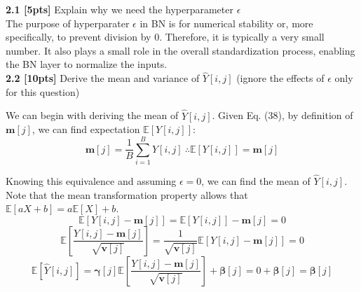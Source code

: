 \documentclass{article}
\begin{document}
\noindent
\textbf{2.1 [5pts]} Explain why we need the hyperparameter $\epsilon$\\

{\color{blue}
The purpose of hyperparater $\epsilon$ in BN is for numerical stability or, more specifically, to prevent division by 0. Therefore, it is typically a very small number. It also plays a small role in the overall standardization process, enabling the BN layer to normalize the inputs. 
}\\

\noindent
\textbf{2.2 [10pts]} Derive the mean and variance of $\hat{Y}[i,j]$ (ignore the effects of $\epsilon$ only for this question)\\

{\color{blue}
We can begin with deriving the mean of $\hat{Y}[i,j]$. Given Eq. (38), by definition of $\textbf{m}[j]$, we can find expectation $\mathbb{E}[Y[i,j]]$:
\begin{equation}
    \textbf{m}[j]= \frac{1}{B} \sum_{i=1}^{B}Y[i,j] \ \therefore \mathbb{E}[Y[i,j]]= \textbf{m}[j]
\end{equation}

Knowing this equivalence and assuming $\epsilon=0$, we can find the mean of $\hat{Y}[i,j]$. Note that the mean transformation property allows that $\mathbb{E}[aX+ b]= a \mathbb{E}[X]+b$.
\begin{equation}
    \mathbb{E}[Y[i,j]- \textbf{m}[j]]= \mathbb{E}[Y[i,j]]- \textbf{m}[j]= 0
\end{equation}
\begin{equation}
    \mathbb{E}\left[\frac{Y[i,j]- \textbf{m}[j]}{\sqrt{\textbf{v}[j]}}\right]= \frac{1}{\sqrt{\textbf{v}[j]}} \mathbb{E}[Y[i,j]- \textbf{m}[j]]= 0
\end{equation}
\begin{equation}
    \mathbb{E}[\hat{Y}[i,j]]= \boldsymbol{\gamma}[j] \mathbb{E}\left[\frac{Y[i,j]- \textbf{m}[j]}{\sqrt{\textbf{v}[j]}}\right]+ \boldsymbol{\beta}[j]= 0+ \boldsymbol{\beta}[j]= \boldsymbol{\beta}[j]
\end{equation}

}
\end{document}
